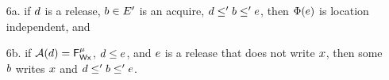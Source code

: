 \begin{definition}
\begin{enumerate}
\item[6a.] if $\bEv$ is a release, $\dEv\in\Event'$ is an acquire,
  $\bEv\le'\dEv\le'\aEv$, then $\labelingForm(\aEv)$ is location independent, and
\item[6b.] if $\labelingAct(\bEv)=\DFW[\aLoc]{\amode}$, $\bEv\le\aEv$, and
  $\aEv$ is a release that does not write $\aLoc$, then  some
  $\dEv$ writes $\aLoc$ and $\bEv\le'\dEv\le'\aEv$. %
\end{enumerate}
\end{definition}


